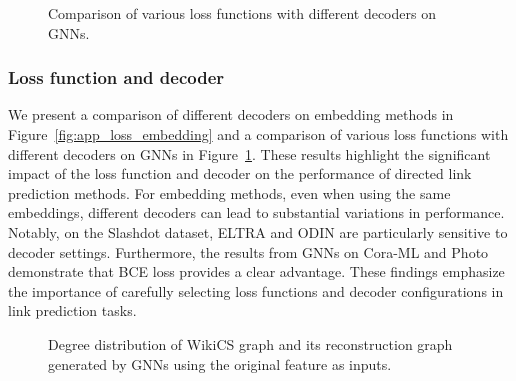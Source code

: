  \begin{figure}[ht]
    \centering
   \vspace{-1mm}
   \vspace{-2mm}
   \caption{Comparison of various loss functions with different decoders on GNNs.}
    \label{fig:app_loss_gnn}
 \end{figure}

\subsubsection{Loss function and decoder}\label{app_loss_function}
We present a comparison of different decoders on embedding methods in Figure~\ref{fig:app_loss_embedding} and a comparison of various loss functions with different decoders on GNNs in Figure~\ref{fig:app_loss_gnn}. These results highlight the significant impact of the loss function and decoder on the performance of directed link prediction methods. For embedding methods, even when using the same embeddings, different decoders can lead to substantial variations in performance. Notably, on the Slashdot dataset, ELTRA and ODIN are particularly sensitive to decoder settings. Furthermore, the results from GNNs on Cora-ML and Photo demonstrate that BCE loss provides a clear advantage. These findings emphasize the importance of carefully selecting loss functions and decoder configurations in link prediction tasks.


\begin{figure}[h]
\centering
   \vspace{-2mm}
   \hspace{-2mm}
   \hspace{-7mm}
   \hspace{-7mm}
   \hspace{-7mm}
   \hspace{-7mm}
   \vspace{-5mm}
   \centering
   \caption{Degree distribution of WikiCS graph and its reconstruction graph generated by GNNs using the original feature as inputs.}
   \label{fig:app_degree_feature}
\end{figure}


